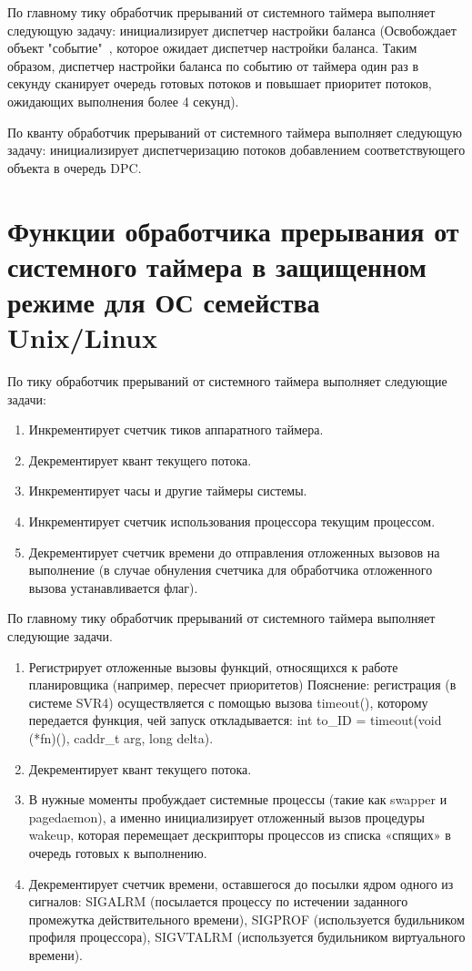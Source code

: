 \documentclass[12pt]{report}
\begin{document}
По главному тику обработчик прерываний от системного таймера выполняет следующую задачу: инициализирует диспетчер настройки баланса (Освобождает объект "событие"\ , которое ожидает диспетчер настройки баланса. Таким образом, диспетчер настройки баланса по событию от таймера один раз в секунду сканирует очередь готовых потоков и повышает приоритет потоков, ожидающих выполнения более 4 секунд).

По кванту обработчик прерываний от системного таймера выполняет следующую задачу: инициализирует диспетчеризацию потоков добавлением соответствующего объекта в очередь DPC.

\section{Функции обработчика прерывания от системного таймера в защищенном режиме для ОС семейства Unix/Linux}

По тику обработчик прерываний от системного таймера выполняет следующие задачи:
\begin{enumerate}
\item Инкрементирует счетчик тиков аппаратного таймера.
\item Декрементирует квант текущего потока.
\item Инкрементирует часы и другие таймеры системы.
\item Инкрементирует счетчик использования процессора текущим процессом.
\item Декрементирует счетчик времени до отправления отложенных вызовов на выполнение (в случае обнуления счетчика для обработчика отложенного вызова устанавливается флаг).
\end{enumerate}

По главному тику обработчик прерываний от системного таймера выполняет следующие задачи.
\begin{enumerate}
\item Регистрирует отложенные вызовы функций, относящихся к работе планировщика (например, пересчет приоритетов) Пояснение: регистрация (в системе SVR4) осуществляется с помощью вызова timeout(), которому передается функция, чей запуск откладывается: int to\_ID = timeout(void (*fn)(), caddr\_t arg, long delta).
\item Декрементирует квант текущего потока.
\item В нужные моменты пробуждает системные процессы (такие как swapper и pagedaemon), а именно инициализирует отложенный вызов процедуры wakeup, которая перемещает дескрипторы процессов из списка «спящих» в очередь готовых к выполнению.
\item Декрементирует счетчик времени, оставшегося до посылки ядром одного из сигналов: SIGALRM (посылается процессу по истечении заданного промежутка действительного времени), SIGPROF (используется будильником профиля процессора), SIGVTALRM (используется будильником виртуального времени).
\end{enumerate}
\end{document}
